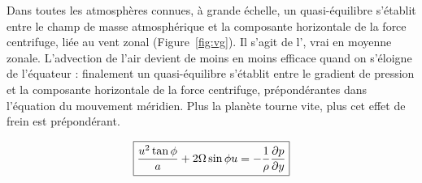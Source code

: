 \sk
Dans toutes les atmosphères connues, à grande échelle, un quasi-équilibre s'établit entre le champ de masse atmosphérique et la composante horizontale de la force centrifuge, liée au vent zonal (Figure~\ref{fig:vg}). Il s'agit de l', vrai en moyenne zonale. L'advection de l'air devient de moins en moins efficace quand on s'éloigne de l'équateur : finalement un quasi-équilibre s'établit entre le gradient de pression et la composante horizontale de la force centrifuge, prépondérantes dans l'équation du mouvement méridien. Plus la planète tourne vite, plus cet effet de frein est prépondérant. 

\[
\boxed{\dfrac{u^2\tan\phi}{a} + 2\Omega\sin\phi u = -\dfrac{1}{\rho}\dfrac{\partial p }{\partial y}}
\]


